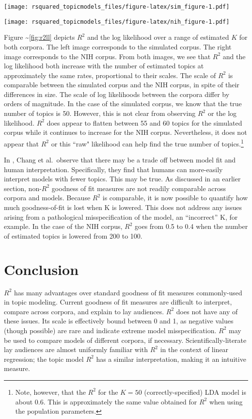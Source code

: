 \documentclass[conference,final,]{IEEEtran}
\makeatletter
\def\maxwidth{\ifdim\Gin@nat@width>\linewidth\linewidth
\else\Gin@nat@width\fi}
\let\Oldincludegraphics\includegraphics
\renewcommand{\includegraphics}[1]{\Oldincludegraphics[width=\maxwidth]{#1}}
\makeatother
\begin{document}
\texttt{[image: rsquared\_topicmodels\_files/figure-latex/sim\_figure-1.pdf]}

\texttt{[image: rsquared\_topicmodels\_files/figure-latex/nih\_figure-1.pdf]}

Figure \textasciitilde{}\ref{fig:r2ll} depicts \(R^2\) and the log
likelihood over a range of estimated \(K\) for both corpora. The left
image corresponds to the simulated corpus. The right image corresponds
to the NIH corpus. From both images, we see that \(R^2\) and the log
likelihood both increase with the number of estimated topics at
approximately the same rates, proportional to their scales. The scale of
\(R^2\) is comparable between the simulated corpus and the NIH corpus,
in spite of their differences in size. The scale of log likelihoods
between the corpora differ by orders of magnitude. In the case of the
simulated corpus, we know that the true number of topics is 50. However,
this is not clear from observing \(R^2\) or the log likelihood. \(R^2\)
does appear to flatten between 55 and 60 topics for the simulated corpus
while it continues to increase for the NIH corpus. Nevertheless, it does
not appear that \(R^2\) or this ``raw" likelihood can help find the true
number of
topics.\footnote{Note, however, that the $R^2$ for the $K = 50$ (correctly-specified) LDA model is about 0.6. This is approximately the same value obtained for $R^2$ when using the population parameters.}

In \cite{chang09}, Chang et al.~observe that there may be a trade off
between model fit and human interpretation. Specifically, they find that
humans can more-easily interpret models with fewer topics. This may be
true. As discussed in an earlier section, non-\(R^2\) goodness of fit
measures are not readily comparable across corpora and models. Because
\(R^2\) is comparable, it is now possible to quantify how much
goodness-of-fit is lost when K is lowered. This does not address any
issues arising from a pathological misspecification of the model, an
``incorrect'' K, for example. In the case of the NIH corpus, \(R^2\)
goes from 0.5 to 0.4 when the number of estimated topics is lowered from
200 to 100.

\hypertarget{conclusion}{%
\section{Conclusion}\label{conclusion}}

\(R^2\) has many advantages over standard goodness of fit measures
commonly-used in topic modeling. Current goodness of fit measures are
difficult to interpret, compare across corpora, and explain to lay
audiences. \(R^2\) does not have any of these issues. Its scale is
effectively bound between 0 and 1, as negative values (though possible)
are rare and indicate extreme model misspecification. \(R^2\) may be
used to compare models of different corpora, if necessary.
Scientifically-literate lay audiences are almost uniformly familiar with
\(R^2\) in the context of linear regression; the topic model \(R^2\) has
a similar interpretation, making it an intuitive measure.
\end{document}

